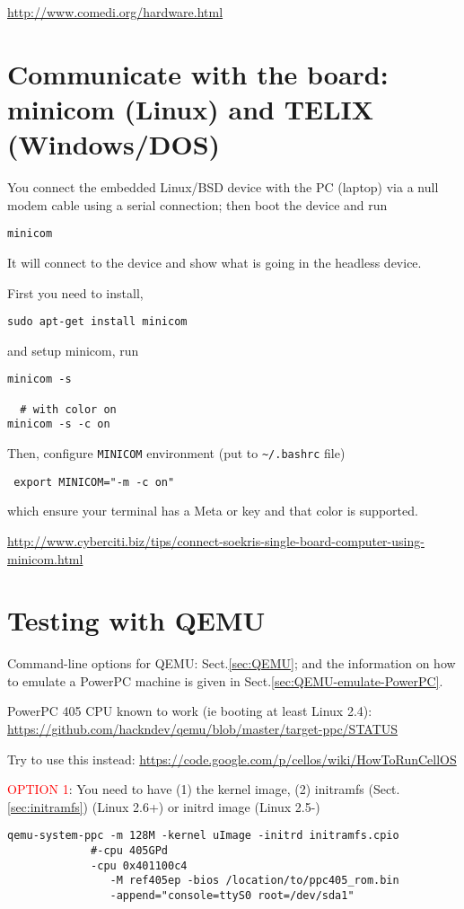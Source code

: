 \url{http://www.comedi.org/hardware.html}


\section{Communicate with the board: minicom (Linux) and TELIX (Windows/DOS)}
\label{sec:minicom}
\label{sec:TELEX}

You connect the embedded Linux/BSD device with the PC (laptop) via a null modem cable using a serial connection;
then boot the device and run
\begin{verbatim}
minicom
\end{verbatim}
It will connect to the device and show what is going in the headless device.

First you need to install, 
\begin{verbatim}
sudo apt-get install minicom
\end{verbatim}
and setup minicom, run
\begin{verbatim}
minicom -s

  # with color on
minicom -s -c on
\end{verbatim}
Then, configure \verb!MINICOM! environment (put to \verb!~/.bashrc! file)
\begin{verbatim}
 export MINICOM="-m -c on"
\end{verbatim}
which ensure your terminal has a Meta or key and that color is supported.

\url{http://www.cyberciti.biz/tips/connect-soekris-single-board-computer-using-minicom.html}


\section{Testing with QEMU}

Command-line options for QEMU: Sect.\ref{sec:QEMU}; and the information on how
to emulate a PowerPC machine is given in Sect.\ref{sec:QEMU-emulate-PowerPC}.



PowerPC 405 CPU known to work (ie booting at least Linux 2.4):
\url{https://github.com/hackndev/qemu/blob/master/target-ppc/STATUS}

Try to use this instead: 
\url{https://code.google.com/p/cellos/wiki/HowToRunCellOS}

\textcolor{red}{OPTION 1}: You need to have (1) the kernel image, (2) initramfs
(Sect.\ref{sec:initramfs}) (Linux 2.6+) or initrd image (Linux 2.5-)
\begin{verbatim}
qemu-system-ppc -m 128M -kernel uImage -initrd initramfs.cpio 
             #-cpu 405GPd
             -cpu 0x401100c4 
                -M ref405ep -bios /location/to/ppc405_rom.bin 
                -append="console=ttyS0 root=/dev/sda1"
\end{verbatim}

